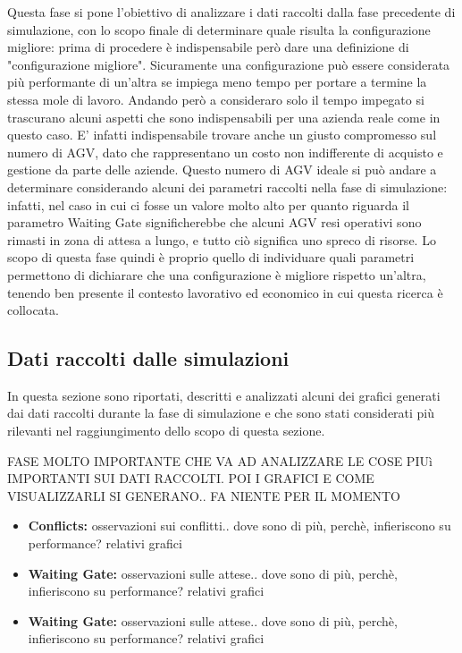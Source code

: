 \documentclass[12pt]{article}
\begin{document}
Questa fase si pone l'obiettivo di analizzare i dati raccolti dalla fase precedente di simulazione, con lo scopo finale di determinare quale risulta la configurazione migliore: prima di procedere è indispensabile però dare una definizione di "configurazione migliore". \newline
Sicuramente una configurazione può essere considerata più performante di un'altra se impiega meno tempo per portare a termine la stessa mole di lavoro. Andando però a consideraro solo il tempo impegato si trascurano alcuni aspetti che sono indispensabili per una azienda reale come in questo caso. E' infatti indispensabile trovare anche un giusto compromesso sul numero di AGV, dato che rappresentano un costo non indifferente di acquisto e gestione da parte delle aziende. \newline 
Questo numero di AGV ideale si può andare a determinare considerando alcuni dei parametri raccolti nella fase di simulazione: infatti, nel caso in cui ci fosse un valore molto alto per quanto riguarda il parametro Waiting Gate significherebbe che alcuni AGV resi operativi sono rimasti in zona di attesa a lungo, e tutto ciò significa uno spreco di risorse. \newline
\newline
Lo scopo di questa fase quindi è proprio quello di individuare quali parametri permettono di dichiarare che una configurazione è migliore rispetto un'altra, tenendo ben presente il contesto lavorativo ed economico in cui questa ricerca è collocata. 

\subsection{Dati raccolti dalle simulazioni}
In questa sezione sono riportati, descritti e analizzati alcuni dei grafici generati dai dati raccolti durante la fase di simulazione e che sono stati considerati più rilevanti nel raggiungimento dello scopo di questa sezione. \newline

FASE MOLTO IMPORTANTE CHE VA AD ANALIZZARE LE COSE PIUì IMPORTANTI SUI DATI RACCOLTI. POI I GRAFICI E COME VISUALIZZARLI SI GENERANO.. FA NIENTE PER IL MOMENTO

\begin{itemize}
    \item \textbf{Conflicts: } osservazioni sui conflitti.. dove sono di più, perchè, infieriscono su performance? relativi grafici 
    \item \textbf{Waiting Gate: } osservazioni sulle attese.. dove sono di più, perchè, infieriscono su performance? relativi grafici 
    \item \textbf{Waiting Gate: } osservazioni sulle attese.. dove sono di più, perchè, infieriscono su performance? relativi grafici 
\end{itemize}
\end{document}
